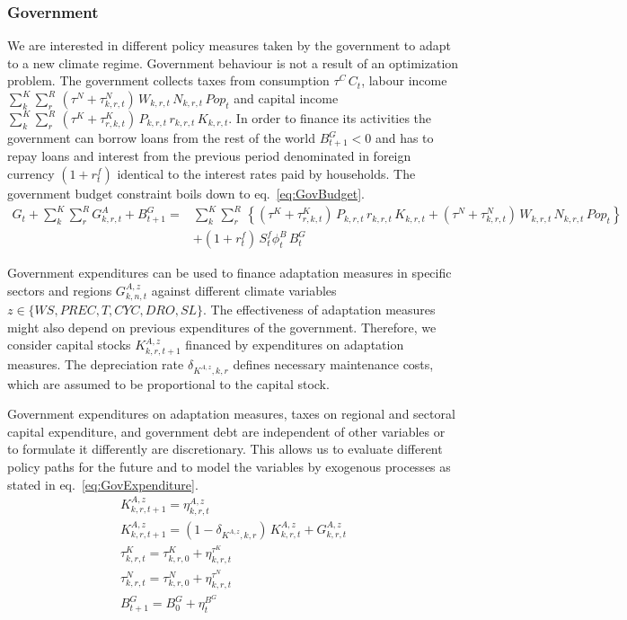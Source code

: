 \documentclass[10pt,a4paper]{article}
\begin{document}
\subsubsection{Government}

We are interested in different policy measures taken by the government to adapt to a new climate regime. Government behaviour is not a result of an optimization problem. The government collects taxes from consumption $\tau^{C} \, C_{t}$, labour income $\sum_{k}^{K} \sum_{r}^{R} \, (\tau^{N} + \tau_{k,r,t}^{N}) \, W_{k,r,t} \, N_{k,r,t} \, Pop_{t}$ and capital income $\sum_{k}^{K} \sum_{r}^{R} \, (\tau^{K} + \tau_{r,k,t}^{K}) \, P_{k,r,t} \, r_{k,r,t} \, K_{k,r,t}$. In order to finance its activities the government can borrow loans from the rest of the world $B^{G}_{t+1}<0$ and has to repay loans and interest from the previous period denominated in foreign currency $(1 + r^{f}_{t})$ identical to the interest rates paid by households. The government budget constraint boils down to eq.~\ref{eq:GovBudget}.
\begin{align}\label{eq:GovBudget}
G_{t} + \sum_{k}^{K} \sum_{r}^{R} G^{A}_{k,r,t} + B^G_{t+1} =& \sum_{k}^{K} \sum_{r}^{R} \, \left\lbrace (\tau^{K} + \tau_{r,k,t}^{K}) \, P_{k,r,t} \, r_{k,r,t} \, K_{k,r,t} + (\tau^{N} + \tau_{k,r,t}^{N}) \, W_{k,r,t} \, N_{k,r,t} \, Pop_{t} \right\rbrace \nonumber \\
& + (1 + r^{f}_{t}) \, S^{f}_{t} \phi^{B}_{t} \, B^G_{t}
\end{align}

Government expenditures can be used to finance adaptation measures in specific sectors and regions $G^{A,z}_{k,n,t}$ against different climate variables $z \in \{WS,PREC,T,CYC,DRO,SL\}$. The effectiveness of adaptation measures might also depend on previous expenditures of the government. Therefore, we consider capital stocks $K^{A,z}_{k,r,t+1}$ financed by expenditures on adaptation measures. The depreciation rate $\delta_{K^{A,z},k,r}$ defines necessary maintenance costs, which are assumed to be proportional to the capital stock.  

Government expenditures on adaptation measures, taxes on regional and sectoral capital expenditure, and government debt are independent of other variables or to formulate it differently are discretionary. This allows us to evaluate different policy paths for the future and to model the variables by exogenous processes as stated in eq.~\ref{eq:GovExpenditure}.
\begin{align}\label{eq:GovExpenditure}
K^{A,z}_{k,r,t+1} = \eta^{A,z}_{k,r,t} \nonumber \\
K^{A,z}_{k,r,t+1} = (1 - \delta_{K^{A,z},k,r}) \, K^{A,z}_{k,r,t} + G^{A,z}_{k,r,t} \nonumber \\
\tau^{K}_{k,r,t} = \tau^{K}_{k,r,0} + \eta^{\tau^{K}}_{k,r,t} \nonumber \\
\tau^{N}_{k,r,t} = \tau^{N}_{k,r,0} + \eta^{\tau^{N}}_{k,r,t} \nonumber \\
B^G_{t+1} = B^G_{0} + \eta^{B^{G}}_{t}
\end{align} 
\end{document}
